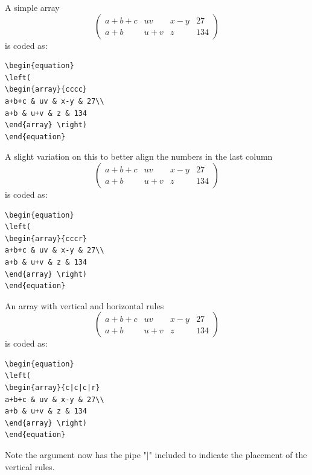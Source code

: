 \documentclass[lettersize,journal]{IEEEtran}
\begin{document}
A simple array
\begin{equation}
\left(
\begin{array}{cccc}
a+b+c & uv & x-y & 27\\
a+b & u+v & z & 134
\end{array}\right)
\end{equation}
is coded as:
\begin{verbatim}
\begin{equation}
\left(
\begin{array}{cccc}
a+b+c & uv & x-y & 27\\
a+b & u+v & z & 134
\end{array} \right)
\end{equation}
\end{verbatim}

A slight variation on this to better align the numbers in the last column
\begin{equation}
\left(
\begin{array}{cccr}
a+b+c & uv & x-y & 27\\
a+b & u+v & z & 134
\end{array}\right)
\end{equation}
is coded as:
\begin{verbatim}
\begin{equation}
\left(
\begin{array}{cccr}
a+b+c & uv & x-y & 27\\
a+b & u+v & z & 134
\end{array} \right)
\end{equation}
\end{verbatim}

An array with vertical and horizontal rules
\begin{equation}
\left( \begin{array}{c|c|c|r}
a+b+c & uv & x-y & 27\\ \hline
a+b & u+v & z & 134
\end{array}\right)
\end{equation}
is coded as:
\begin{verbatim}
\begin{equation}
\left(
\begin{array}{c|c|c|r}
a+b+c & uv & x-y & 27\\
a+b & u+v & z & 134
\end{array} \right)
\end{equation}
\end{verbatim}
Note the argument now has the pipe "$\vert$" included to indicate the placement of the vertical rules.
\end{document}
